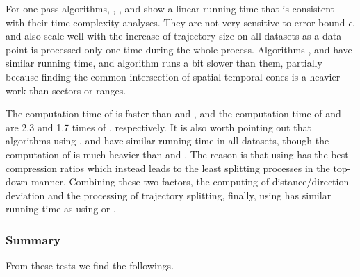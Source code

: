 For one-pass algorithms, \operb, \siped, \cised and \interval show a linear running time that is consistent with their time complexity analyses. They are not very sensitive to error bound $\epsilon$, and also scale well with the increase of trajectory size on all datasets as a data point is processed only one time during the whole process.
Algorithms \siped, \operb and \interval have similar running time, and algorithm \cised runs a bit slower than them, partially because finding the common intersection of spatial-temporal cones is a heavier work than sectors or ranges.


The computation time of \dad is faster than \ped and \sed, and the computation time of \ped and \sed are 2.3 and 1.7 times of \dad, respectively.
{It is also worth pointing out that algorithms \dpa using \ped, \sed and \dad have similar running time in all datasets, though the computation of \ped is much heavier than \sed and \dad. The reason is that \dpa using \ped has the best compression ratios which instead leads to the least splitting processes in the top-down manner. Combining these two factors, \ie the computing of distance/direction deviation and the processing of trajectory splitting, finally, \dpa using \ped has similar running time as \dpa using \dad or \sed.}




\subsubsection{Summary}
From these tests we find the followings.

